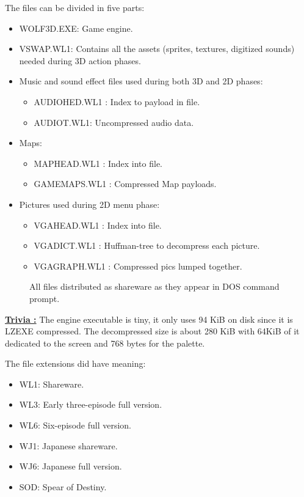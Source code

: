 \documentclass[book.tex]{subfiles}
\begin{document}
  \par
 The files can be divided in five parts:
 \begin{itemize}
 \item WOLF3D.EXE: Game engine.
 \item VSWAP.WL1: Contains all the assets (sprites, textures, digitized sounds) needed during 3D action phases.
 \item Music and sound effect files used during both 3D and 2D phases:
     \begin{itemize}
     \item AUDIOHED.WL1 : Index to payload in  file.
     \item AUDIOT.WL1: Uncompressed audio data. 
     \end{itemize}
\item Maps:
     \begin{itemize}
     \item MAPHEAD.WL1 : Index into  file.
      \item GAMEMAPS.WL1 : Compressed Map payloads.
      \end{itemize}
\item Pictures used during 2D menu phase:
    \begin{itemize} 
    \item VGAHEAD.WL1 : Index into  file.
    \item VGADICT.WL1 : Huffman-tree to decompress each picture.
    \item VGAGRAPH.WL1 : Compressed pics lumped together.
     \end{itemize}
\end{itemize}

\par
 \begin{figure}[H]
\centering
 \caption{All files distributed as shareware as they appear in DOS command prompt.}
  \end{figure}
 \par
\textbf{\underline{Trivia :}} The engine executable is tiny, it only uses 94 KiB on disk since it is LZEXE compressed. The decompressed size is about 280 KiB with 64KiB of it dedicated to the  screen and 768 bytes for the palette.
\pagebreak





The file extensions did have meaning: 
\begin{itemize}
\item WL1: Shareware.
\item WL3: Early three-episode full version.
\item WL6: Six-episode full version.
\item WJ1: Japanese shareware.
\item WJ6: Japanese full version.
\item SOD: Spear of Destiny.
\end{itemize}
 
\end{document}
